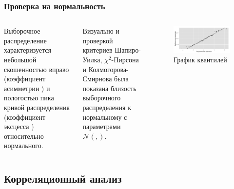 \documentclass[10pt,pdf,aspectratio=169,hyperref={unicode}]{beamer}
\newcommand{\inp}[1]{}
\newcommand{\descriptive}[2]{\inp{#1/descriptive/#2}}
\newcommand{\normaldistr}{$\mathcal{N}(\descriptive{original}{mean}, \descriptive{original}{variance})$}
\begin{document}
\begin{frame}
  \frametitle{Проверка на нормальность}
  \begin{columns}[c]
  \column{2in}
  Выборочное распределение характеризуется небольшой скошенностью вправо (коэффициент асимметрии $ \descriptive{original}{skew} $) и пологостью пика кривой распределения (коэффициент эксцесса $ \descriptive{original}{kurtosis} $) относительно нормального.

  \vspace{0.5em}

  Визуально и проверкой критериев Шапиро-Уилка, $\chi^2$-Пирсона и Колмогорова-Смирнова была показана близость выборочного распределения к нормальному с параметрами \normaldistr.
  \column{4in}
  \begin{figure}[h]
    \includegraphics[width=1\linewidth]{../../figures/original/quantile.png}
    \caption{График квантилей}
  \end{figure}
  \end{columns}
\end{frame}

\subsection{Корреляционный анализ}
\end{document}
